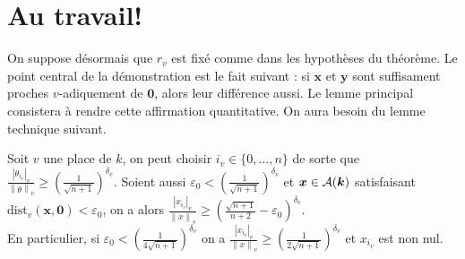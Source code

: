 \documentclass[11pt, twoside, a4paper, french]{article}
\numberwithin{equation}{section}
\renewcommand{\ge}{\geqslant} \renewcommand{\le}{\leqslant}
\newcommand{\eps}{\varepsilon} \newcommand{\truc}{\,\cdot\,}
\newcommand{\av}[2][v]{\left\lvert#2\right\rvert_{#1}} 		%
\newcommand{\nv}[2][v]{\left\lVert#2\right\rVert_{#1}} 		%
\newcommand{\dv}{{\delta_v}} 					%
\newcommand{\Dv}{\mathrm{dist}_v} 				%
\newcommand{\A}{\mathcal{A}} 					%
\newcommand{\p}[1]{{\boldsymbol{#1}}} 				%
\newcommand{\OA}{\p{0}} 					%
\newcommand{\coa}{\theta} 					%
\begin{document}
\section{Au travail!}

On suppose désormais que $r_v$ est fixé comme dans les hypothèses du théorème. Le point central de la démonstration est le fait suivant : si $\p{x}$ et $\p{y}$ sont suffisament proches $v$-adiquement de $\OA$, alors leur différence aussi. Le lemme principal consistera à rendre cette affirmation quantitative. On aura besoin du lemme technique suivant.

\begin{lem} \label{pv}
Soit $v$ une place de $k$, on peut choisir $i_v \in \{ 0, \dots, n\}$ de sorte que $\frac{\av{\coa_{i_v}}}{\nv{\coa}} \ge (\frac{1}{\sqrt{n+1}})^\dv $. Soient aussi $\eps_0 < (\frac{1}{\sqrt{n+1}})^\dv$ et $\p{x} \in \A(\cdn)$ satisfaisant $\Dv(\p{x}, \OA) < \eps_0$, on a alors $\frac{\av{x_{i_v}}}{\nv{x}} \ge (\frac{\sqrt{n+1}}{n+2}-\eps_0)^\dv$. \\
En particulier, si $\eps_0 < (\frac{1}{4\sqrt{n+1}})^\dv$ on a $\frac{\av{x_{i_v}}}{\nv{x}} \ge (\frac{1}{2\sqrt{n+1}})^\dv$ et $x_{i_v}$ est non nul.
\end{lem}
\end{document}
